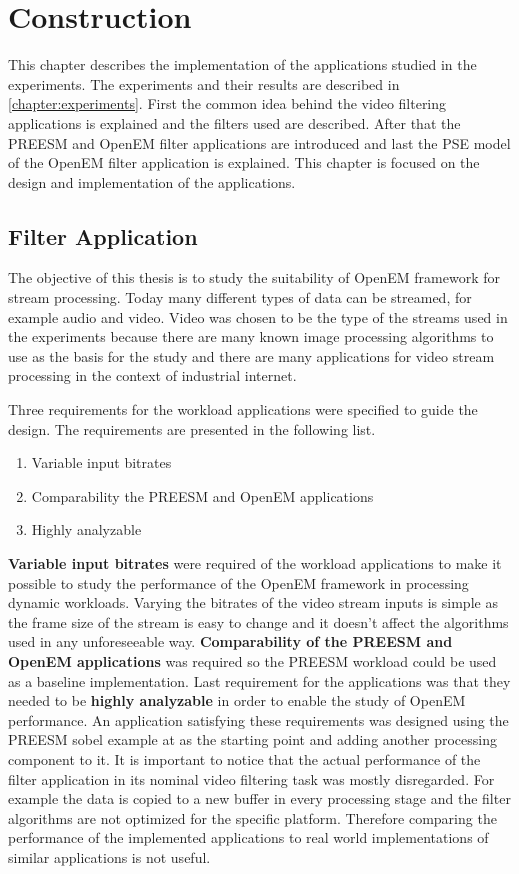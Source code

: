 \chapter{Construction}
\label{chapter:construction}
This chapter describes the implementation of the applications studied in the
experiments. The experiments and their results are described in
\ref{chapter:experiments}. First the common idea behind the video filtering
applications is explained and the filters used are described. After that the
PREESM and OpenEM filter applications are introduced and last the PSE model of
the OpenEM filter application is explained. This chapter is focused on the
design and implementation of the applications.

\section{Filter Application}
\label{sec:filterapp}
The objective of this thesis is to study the suitability of OpenEM framework
for stream processing. Today many different types of data can be streamed, for
example audio and video. Video was chosen to be the type of the streams used in
the experiments because there are many known image processing algorithms to use
as the basis for the study and there are many applications for video stream
processing in the context of industrial internet. 

Three requirements for the workload applications were specified to guide the
design. The requirements are presented in the following list.

\begin{enumerate}
    \item{Variable input bitrates}
    \item{Comparability the PREESM and OpenEM applications}
    \item{Highly analyzable}
\end{enumerate}

\textbf{Variable input bitrates} were required of the workload applications to
make it possible to study the performance of the OpenEM framework in processing
dynamic workloads. Varying the bitrates of the video stream inputs is simple as
the frame size of the stream is easy to change and it doesn't affect the
algorithms used in any unforeseeable way. \textbf{Comparability of the PREESM
and OpenEM applications} was required so the PREESM workload could be used as a
baseline implementation. Last requirement for the applications was that they
needed to be \textbf{highly analyzable} in order to enable the study of OpenEM
performance. An application satisfying these requirements was designed using the
PREESM sobel example at \cite{preesmtut} as the starting point and adding
another processing component to it. It is important to notice that the actual
performance of the filter application in its nominal video filtering task was
mostly disregarded. For example the data is copied to a new buffer in every
processing stage and the filter algorithms are not optimized for the specific
platform. Therefore comparing the performance of the implemented applications to
real world implementations of similar applications is not useful.

